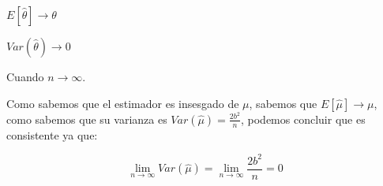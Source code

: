 \documentclass[a4paper, 10pt]{article} %
\begin{document}
\begin{description}
	\item $E[\hat{\theta}] \rightarrow \theta$
	\item $Var(\hat{\theta}) \rightarrow 0$
	\item Cuando $n \rightarrow \infty$.
\end{description}

Como sabemos que el estimador es insesgado de $\mu$, sabemos que $E[\hat{\mu}] \rightarrow \mu$, como sabemos que su varianza
es $Var(\hat{\mu}) = \frac{2 b^2}{n}$, podemos concluir que es consistente ya que:

$$\lim\limits_{n \rightarrow \infty} Var(\hat{\mu}) = \lim\limits_{n \rightarrow \infty} \frac{2 b^2}{n} = 0$$
\end{document}
